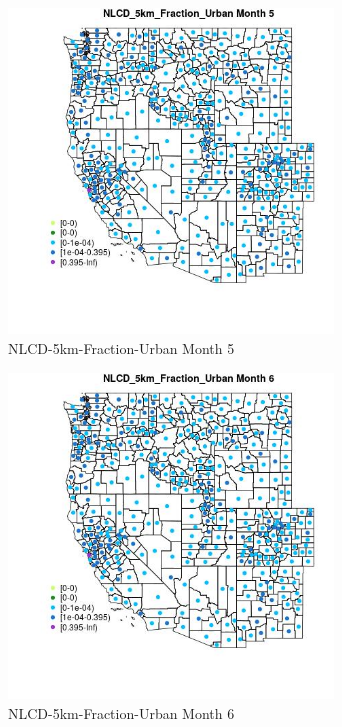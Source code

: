 \begin{figure} 
\centering  
\includegraphics[width=0.77\textwidth]{Code_Outputs/df_report_ML_predictors_CountyCentroid_Locations_Dates_2008-01-01to2018-12-31_MapObsMo5NLCD_5km_Fraction_Urban.jpg} 
\caption{\label{fig:df_report_ML_predictors_CountyCentroid_Locations_Dates_2008-01-01to2018-12-31MapObsMo5NLCD_5km_Fraction_Urban}NLCD-5km-Fraction-Urban Month 5} 
\end{figure} 
 

\begin{figure} 
\centering  
\includegraphics[width=0.77\textwidth]{Code_Outputs/df_report_ML_predictors_CountyCentroid_Locations_Dates_2008-01-01to2018-12-31_MapObsMo6NLCD_5km_Fraction_Urban.jpg} 
\caption{\label{fig:df_report_ML_predictors_CountyCentroid_Locations_Dates_2008-01-01to2018-12-31MapObsMo6NLCD_5km_Fraction_Urban}NLCD-5km-Fraction-Urban Month 6} 
\end{figure} 
 

